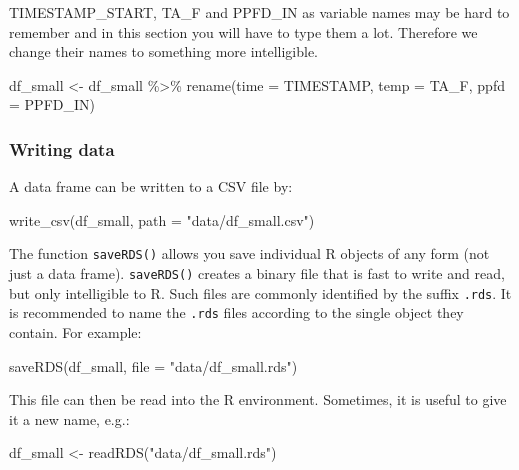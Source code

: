 \documentclass[
]{book}
\newenvironment{Shaded}{\begin{snugshade}}{\end{snugshade}}
\newcommand{\AttributeTok}[1]{\textcolor[rgb]{0.77,0.63,0.00}{#1}}
\newcommand{\FunctionTok}[1]{\textcolor[rgb]{0.00,0.00,0.00}{#1}}
\newcommand{\NormalTok}[1]{#1}
\newcommand{\OtherTok}[1]{\textcolor[rgb]{0.56,0.35,0.01}{#1}}
\newcommand{\SpecialCharTok}[1]{\textcolor[rgb]{0.00,0.00,0.00}{#1}}
\newcommand{\StringTok}[1]{\textcolor[rgb]{0.31,0.60,0.02}{#1}}
\begin{document}
TIMESTAMP\_START, TA\_F and PPFD\_IN as variable names may be hard to remember and in this section you will have to type them a lot. Therefore we change their names to something more intelligible.

\begin{Shaded}
\begin{Highlighting}[]
\NormalTok{df\_small }\OtherTok{\textless{}{-}}\NormalTok{ df\_small }\SpecialCharTok{\%\textgreater{}\%} 
  \FunctionTok{rename}\NormalTok{(}\AttributeTok{time =}\NormalTok{ TIMESTAMP, }\AttributeTok{temp =}\NormalTok{ TA\_F, }\AttributeTok{ppfd =}\NormalTok{ PPFD\_IN)}
\end{Highlighting}
\end{Shaded}

\hypertarget{writing-data}{%
\subsubsection{Writing data}\label{writing-data}}

A data frame can be written to a CSV file by:

\begin{Shaded}
\begin{Highlighting}[]
\FunctionTok{write\_csv}\NormalTok{(df\_small, }\AttributeTok{path =} \StringTok{"data/df\_small.csv"}\NormalTok{)}
\end{Highlighting}
\end{Shaded}

The function \texttt{saveRDS()} allows you save individual R objects of any form (not just a data frame). \texttt{saveRDS()} creates a binary file that is fast to write and read, but only intelligible to R. Such files are commonly identified by the suffix \texttt{.rds}. It is recommended to name the \texttt{.rds} files according to the single object they contain. For example:

\begin{Shaded}
\begin{Highlighting}[]
\FunctionTok{saveRDS}\NormalTok{(df\_small, }\AttributeTok{file =} \StringTok{"data/df\_small.rds"}\NormalTok{)}
\end{Highlighting}
\end{Shaded}

This file can then be read into the R environment. Sometimes, it is useful to give it a new name, e.g.:

\begin{Shaded}
\begin{Highlighting}[]
\NormalTok{df\_small }\OtherTok{\textless{}{-}} \FunctionTok{readRDS}\NormalTok{(}\StringTok{"data/df\_small.rds"}\NormalTok{)}
\end{Highlighting}
\end{Shaded}
\end{document}
